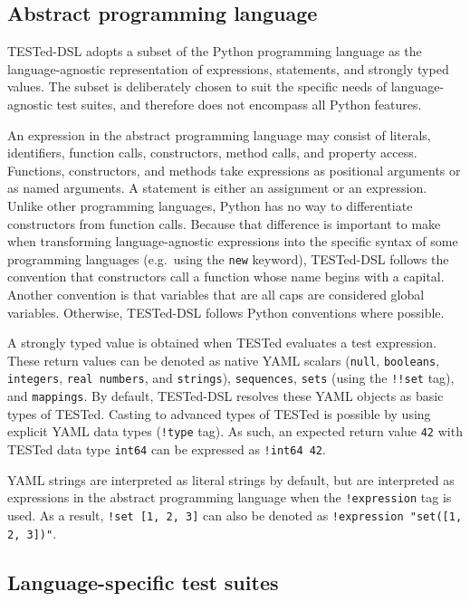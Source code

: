 \documentclass[../main]{subfiles}
\begin{document}
\subsection{Abstract programming language}\label{subsec:dsl-abstract-programming-language}

TESTed-DSL adopts a subset of the Python programming language as the language-agnostic representation of expressions, statements, and strongly typed values.
The subset is deliberately chosen to suit the specific needs of language-agnostic test suites, and therefore does not encompass all Python features.

An expression in the abstract programming language may consist of literals, identifiers, function calls, constructors, method calls, and property access.
Functions, constructors, and methods take expressions as positional arguments or as named arguments.
A statement is either an assignment or an expression.
Unlike other programming languages, Python has no way to differentiate constructors from function calls.
Because that difference is important to make when transforming language-agnostic expressions into the specific syntax of some programming languages (e.g.\ using the \texttt{new} keyword), TESTed-DSL follows the convention that constructors call a function whose name begins with a capital.
Another convention is that variables that are all caps are considered global variables.
Otherwise, TESTed-DSL follows Python conventions where possible.

A strongly typed value is obtained when TESTed evaluates a test expression.
These return values can be denoted as native YAML scalars (\texttt{null}, \texttt{booleans}, \texttt{integers}, \texttt{real numbers}, and \texttt{strings}), \texttt{sequences}, \texttt{sets} (using the \texttt{!!set} tag), and \texttt{mappings}.
By default, TESTed-DSL resolves these YAML objects as basic types of TESTed.
Casting to advanced types of TESTed is possible by using explicit YAML data types (\texttt{!type} tag).
As such, an expected return value \texttt{42} with TESTed data type \texttt{int64} can be expressed as \texttt{!int64 42}.

YAML strings are interpreted as literal strings by default, but are interpreted as expressions in the abstract programming language when the \texttt{!expression} tag is used.
As a result, \texttt{!set [1, 2, 3]} can also be denoted as \texttt{!expression "set([1, 2, 3])"}.

\subsection{Language-specific test suites}\label{subsec:dsl-language-specific-test-suites}
\end{document}
